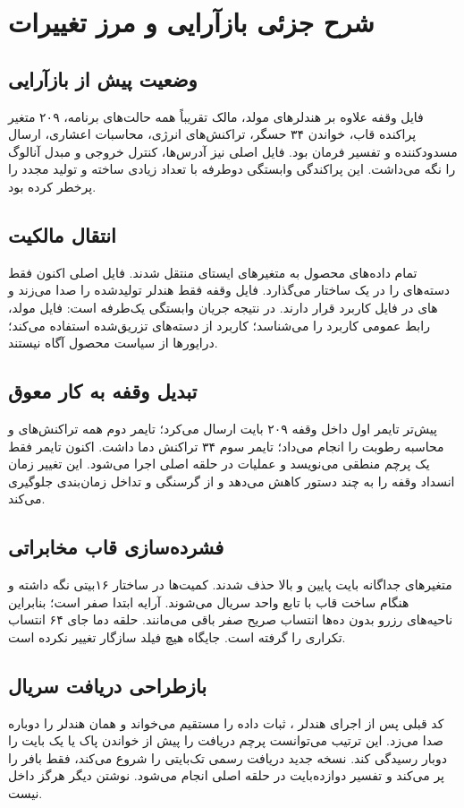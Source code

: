 \chapter{شرح جزئی بازآرایی و مرز تغییرات}

\section{وضعیت پیش از بازآرایی}
فایل وقفه علاوه بر هندلرهای مولد، مالک تقریباً همه حالت‌های برنامه، ۲۰۹ متغیر پراکنده قاب، خواندن ۳۴ حسگر، تراکنش‌های انرژی، محاسبات اعشاری، ارسال مسدودکننده و تفسیر فرمان بود. فایل اصلی نیز آدرس‌ها، کنترل خروجی و
مبدل آنالوگ را نگه می‌داشت. این پراکندگی وابستگی دوطرفه با تعداد زیادی
ساخته و تولید مجدد
را پرخطر کرده بود.

\section{انتقال مالکیت}
تمام داده‌های محصول به متغیرهای ایستای
منتقل شدند. فایل اصلی اکنون فقط دسته‌های
را در یک ساختار می‌گذارد. فایل وقفه فقط هندلر تولیدشده را صدا می‌زند و
های
در فایل کاربرد قرار دارند. در نتیجه جریان وابستگی یک‌طرفه است: فایل مولد، رابط عمومی کاربرد را می‌شناسد؛ کاربرد از دسته‌های تزریق‌شده استفاده می‌کند؛ درایورها از سیاست محصول آگاه نیستند.

\section{تبدیل وقفه به کار معوق}
پیش‌تر تایمر اول داخل وقفه ۲۰۹ بایت ارسال می‌کرد؛ تایمر دوم همه تراکنش‌های
و محاسبه رطوبت را انجام می‌داد؛ تایمر سوم ۳۴ تراکنش دما داشت. اکنون
تایمر فقط یک پرچم منطقی می‌نویسد و عملیات در حلقه اصلی اجرا می‌شود. این تغییر زمان انسداد وقفه را به چند دستور کاهش می‌دهد و از گرسنگی
و تداخل زمان‌بندی جلوگیری می‌کند.

\section{فشرده‌سازی قاب مخابراتی}
متغیرهای جداگانه بایت پایین و بالا حذف شدند. کمیت‌ها در ساختار ۱۶بیتی نگه داشته و هنگام ساخت قاب با تابع واحد سریال می‌شوند. آرایه ابتدا صفر است؛ بنابراین ناحیه‌های رزرو بدون ده‌ها انتساب صریح صفر باقی می‌مانند. حلقه دما جای ۶۴ انتساب تکراری را گرفته است. جایگاه هیچ فیلد سازگار تغییر نکرده است.

\section{بازطراحی دریافت سریال}
کد قبلی پس از اجرای هندلر
،
ثبات داده را مستقیم می‌خواند و همان هندلر را دوباره صدا می‌زد. این ترتیب می‌توانست پرچم دریافت را پیش از خواندن پاک یا یک بایت را دوبار رسیدگی کند. نسخه جدید دریافت رسمی تک‌بایتی
را شروع می‌کند،
فقط بافر را پر می‌کند و تفسیر دوازده‌بایت در حلقه اصلی انجام می‌شود. نوشتن
دیگر هرگز داخل
نیست.

